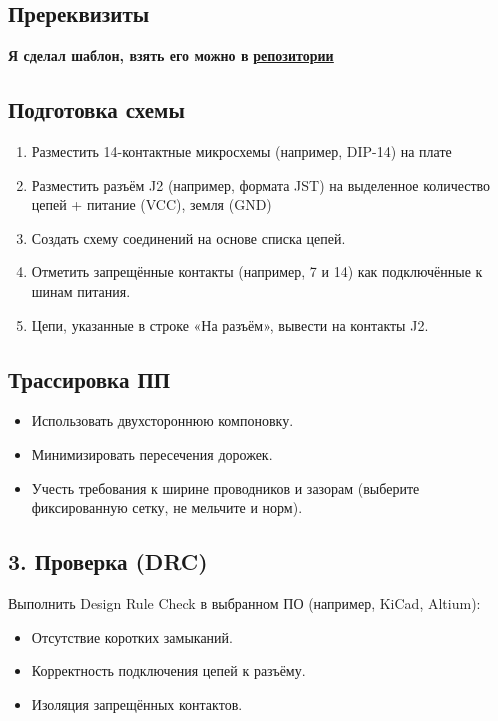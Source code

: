 \documentclass[a4paper, 12pt]{article}
\begin{document}
\subsection{Пререквизиты}
\textbf{Я сделал шаблон, взять его можно в} \underline{\textbf{\href{https://github.com/Imtjl/ic-pcb-engineering}{репозитории}}}

\subsection{Подготовка схемы}
\begin{enumerate}
	\item Разместить 14-контактные микросхемы (например, DIP-14) на плате
	\item Разместить разъём J2 (например, формата JST) на выделенное количество цепей + питание (VCC), земля (GND)
	\item Создать схему соединений на основе списка цепей.
	\item Отметить запрещённые контакты (например, 7 и 14) как подключённые к шинам питания.
	\item Цепи, указанные в строке «На разъём», вывести на контакты J2.
\end{enumerate}

\subsection{Трассировка ПП}
\begin{itemize}
	\item Использовать двухстороннюю компоновку.
	\item Минимизировать пересечения дорожек.
	\item Учесть требования к ширине проводников и зазорам (выберите фиксированную сетку, не мельчите и норм).
\end{itemize}

\subsection{3. Проверка (DRC)}
Выполнить Design Rule Check в выбранном ПО (например, KiCad, Altium):
\begin{itemize}
	\item Отсутствие коротких замыканий.
	\item Корректность подключения цепей к разъёму.
	\item Изоляция запрещённых контактов.
\end{itemize}
\end{document}
